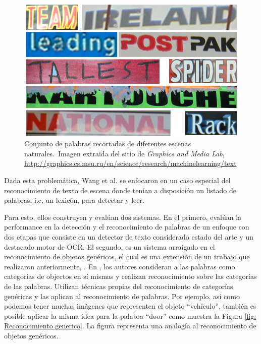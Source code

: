 \begin{itemize}
	\begin{figure}[htbp]
		\centering
		\centerline{ \includegraphics[scale=0.30]{img/cropped_words.png} }
		\caption[Reconocimiento de palabras recortadas]{Conjunto de palabras recortadas de diferentes escenas naturales.~Imagen extraida del sitio de \textit{Graphics and Media Lab}, \url{http://graphics.cs.msu.ru/en/science/research/machinelearning/text}}
		\label{fig: Reconocimiento palabras}
	\end{figure}
		
	\end{itemize}

	Dada esta problemática, Wang et al. se enfocaron en un caso especial del reconocimiento de texto de escena donde tenían a disposición un listado de palabras, i.e, un lexicón, para detectar y leer.
		
	Para esto, ellos construyen y evalúan dos sistemas. En el primero, evalúan la performance en la detección y el reconocimiento de palabras de un enfoque con dos etapas que consiste en un detector de texto considerado estado del arte y un destacado motor de OCR. El segundo, es un sistema arraigado en el reconocimiento de objetos genéricos, el cual es una extensión de un trabajo que realizaron anteriormente, \cite{WB10}. En \cite{WB10}, los autores consideran a las palabras como categorías de objectos en sí mismas y realizan reconocimiento sobre las categorías de las palabras. Utilizan técnicas propias del reconocimiento de categorías genéricas y las aplican al reconocimiento de palabras. Por ejemplo, así como podemos tener muchas imágenes que representen el objeto ``vehículo'', también es posible aplicar la misma idea para la palabra ``door'' como muestra la Figura \ref{fig: Reconocimiento generico}. La figura representa una analogía al reconocimiento de objetos genéricos.
	
